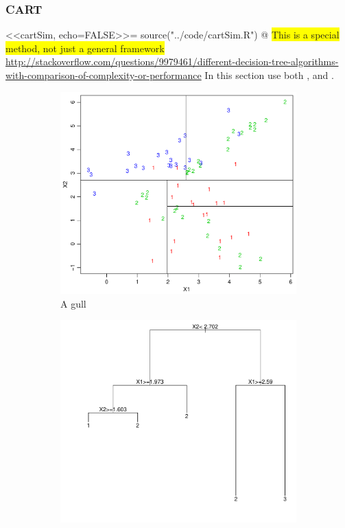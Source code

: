 \subsubsection{CART}
\label{subsub:CART}
<<cartSim, echo=FALSE>>=
source("../code/cartSim.R")
@
\colorbox{yellow}{This is a special method, not just a general framework}\\
\url{http://stackoverflow.com/questions/9979461/different-decision-tree-algorithms-with-comparison-of-complexity-or-performance}
%
In this section use both \cite{bishop} , \cite{modstat} and \cite{breiman}.

\begin{figure}[h!]
  \centering
  \begin{subfigure}[b]{0.48\textwidth}
    \includegraphics[width=\textwidth]{./figures/cartAreas1.pdf}
    \caption{A gull}
    \label{fig:gull}
  \end{subfigure}%
  \quad
  \begin{subfigure}[b]{0.48\textwidth}
    \includegraphics[width=\textwidth]{./figures/cartTree1.pdf}

\end{subfigure}
\end{figure}
